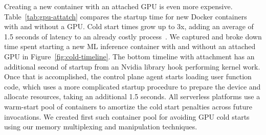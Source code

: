 Creating a new container with an attached GPU is even more expensive.
Table~\ref{tab:gpu-attatch} compares the startup time for new Docker containers with and without a GPU.
Cold start times grow up to 3x, {adding an average of 1.5 seconds of latency} to an already costly process~\cite{du2020catalyzer,lin_mitigating_2019,manner_cold_2018,mohan_agile_2019}.
We captured and broke down time spent starting a new ML inference container with and without an attached GPU in Figure~\ref{fig:cold-timeline}.
The bottom timeline with attachment has an additional second of startup from an Nvidia library hook performing kernel work.
Once that is accomplished, the control plane agent starts loading user function code, which uses a more complicated startup procedure to prepare the device and allocate resources, taking an additional 1.5 seconds.
All serverless platforms use a warm-start pool of containers to amortize the cold start penalties across future invocations.
We created first such container pool for avoiding GPU cold starts using our memory multiplexing and manipulation techniques.

